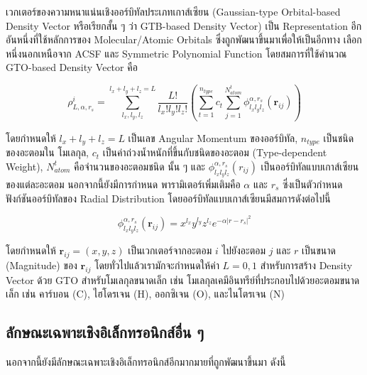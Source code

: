เวกเตอร์ของความหนาแน่นเชิงออร์บิทัลประเภทเกาส์เซียน (Gaussian-type Orbital-based Density Vector หรือเรียกสั้น ๆ ว่า GTB-based
Density Vector) เป็น Representation อีกอันหนึ่งที่ใช้หลักการของ Molecular/Atomic Orbitals ซึ่งถูกพัฒนาขึ้นมาเพื่อให้เป็นอีกทาง%
เลือกหนึ่งนอกเหนือจาก ACSF และ Symmetric Polynomial Function\autocite{kwac2021} โดยสมการที่ใช้คำนวณ GTO-based Density
Vector คือ

\begin{equation}\label{eq:gto_density}
    \rho^{i}_{L,\alpha,r_{s}} = \sum^{l_{x}+l_{y}+l_{z} = L}_{l_{x},l_{y},l_{z}}
    \frac{L!}{l_{x}!l_{y}!l_{z}!} \left ( \sum^{n_{type}}_{t=1} c_{t} \sum^{N^{t}_{atom}}_{j=1}
    \phi^{\alpha,r_{s}}_{l_{x}l_{y}l_{z}} (\bm{r}_{ij}) \right )
\end{equation}

\noindent โดยกำหนดให้ $l_{x}+l_{y}+l_{z} = L$ เป็นเลข Angular Momentum ของออร์บิทัล, $n_{type}$ เป็นชนิดของอะตอมใน%
โมเลกุล, $c_{t}$ เป็นค่าถ่วงน้ำหนักที่ขึ้นกับชนิดของอะตอม (Type-dependent Weight), $N^{t}_{atom}$ คือจำนวนของอะตอมชนิด%
นั้น ๆ และ $\phi^{\alpha,r_{s}}_{l_{x}l_{y}l_{z}} (r_{ij})$ เป็นออร์บิทัลแบบเกาส์เซียนของแต่ละอะตอม นอกจากนี้ยังมีการกำหนด%
พารามิเตอร์เพิ่มเติมคือ $\alpha$ และ $r_{s}$ ซึ่งเป็นตัวกำหนดฟังก์ชันออร์บิทัลของ Radial Distribution\autocite{kwac2021}
โดยออร์บิทัลแบบเกาส์เซียนมีสมการดังต่อไปนี้

\begin{equation}\label{eq:gaussian_orb}
    \phi^{\alpha,r_{s}}_{l_{x}l_{y}l_{z}} (\bm{r}_{ij}) = x^{l_{x}}y^{l_{y}}z^{l_{z}} e^{-\alpha
    |r-r_{s}|^{2}}
\end{equation}

\noindent โดยกำหนดให้ $\bm{r}_{ij} = (x,y,z)$ เป็นเวกเตอร์จากอะตอม $i$ ไปยังอะตอม $j$ และ $r$ เป็นขนาด (Magnitude)
ของ $\bm{r}_{ij}$ โดยทั่วไปแล้วเรามักจะกำหนดให้ค่า $L=0,1$ สำหรับการสร้าง Density Vector ด้วย GTO สำหรับโมเลกุลขนาดเล็ก
เช่น โมเลกุลเคมีอินทรีย์ที่ประกอบไปด้วยอะตอมขนาดเล็ก เช่น คาร์บอน (C), ไฮโดรเจน (H), ออกซิเจน (O), และไนโตรเจน (N)

\subsection{ลักษณะเฉพาะเชิงอิเล็กทรอนิกส์อื่น ๆ}
\label{ssec:other_feat_elec}

นอกจากนี้ยังมีลักษณะเฉพาะเชิงอิเล็กทรอนิกส์อีกมากมายที่ถูกพัฒนาขึ้นมา\autocite{faber2018} ดังนี้

